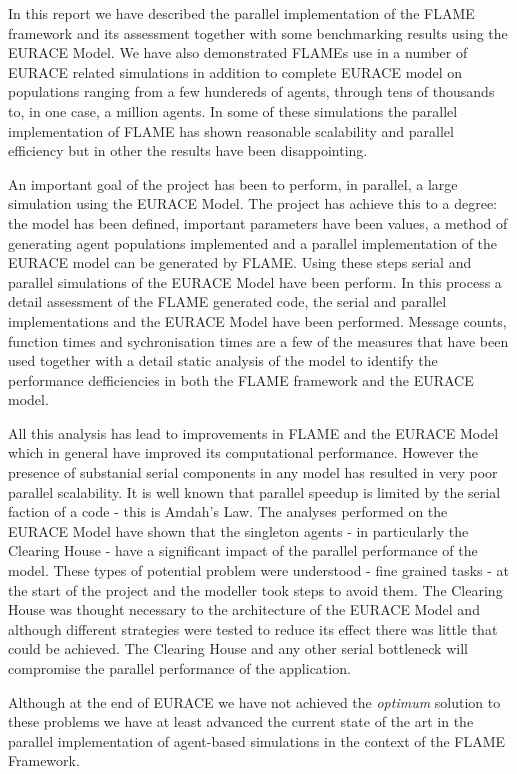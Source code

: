 In this report we have described the parallel implementation of the FLAME framework and its assessment together with some benchmarking results using the EURACE Model. We have also demonstrated FLAMEs use in a number of EURACE related simulations in addition to complete EURACE model on populations ranging from a few hundereds of agents, through tens of thousands to, in one case, a million agents.  In some of these simulations the parallel implementation of FLAME has shown reasonable scalability and parallel efficiency but in other the results have been disappointing.

An important goal of the project has been to perform, in parallel, a large simulation using the EURACE Model. The project has achieve this to a degree: the model has been defined, important parameters have been values, a method of generating agent populations implemented and a parallel implementation of the EURACE model can be generated by FLAME. Using these steps serial and parallel simulations of the EURACE Model have been perform. In this process a detail assessment of the FLAME generated code, the serial and parallel implementations and the EURACE Model have been performed. Message counts, function times and sychronisation times are a few of the measures that have been used together with a detail static analysis of the model to identify the performance defficiencies in both the FLAME framework and the EURACE model.

All this analysis has lead to improvements in FLAME and the EURACE Model which in general have improved its computational performance. However the presence of substanial serial components in any model has resulted in very poor parallel scalability. It is well known that parallel speedup is limited by the serial faction of a code - this is Amdah's Law. The analyses performed on the EURACE Model have shown that the singleton agents - in particularly the Clearing House - have a significant impact of the parallel performance of the model.
These types of potential problem were understood - fine grained tasks - at the start of the project and the modeller took steps to avoid them. The Clearing House was thought necessary to the architecture of the EURACE Model and although different strategies were tested to reduce its effect there was little that could be achieved. The Clearing House and any other serial bottleneck will compromise the parallel performance of the application.

Although at the end of EURACE we have not achieved the \textsl{optimum} solution to these problems we have at least advanced the current state of the art in the parallel implementation of agent-based simulations in the context of the FLAME Framework.
